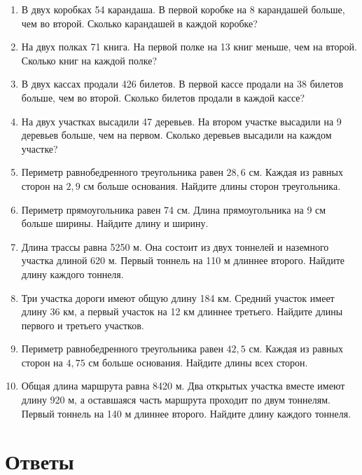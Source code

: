 \documentclass[a4paper,12pt]{article}
\newcommand{\sepLine}{\vspace{0.35em}{\color{accent}\hrule height 0.6pt}\vspace{0.8em}}
\begin{document}
\begin{enumerate}
\item В двух коробках 54 карандаша. В первой коробке на 8 карандашей больше, чем во второй. Сколько карандашей в каждой коробке?

\item На двух полках 71 книга. На первой полке на 13 книг меньше, чем на второй. Сколько книг на каждой полке?

\item В двух кассах продали 426 билетов. В первой кассе продали на 38 билетов больше, чем во второй. Сколько билетов продали в каждой кассе?

\item На двух участках высадили 47 деревьев. На втором участке высадили на 9 деревьев больше, чем на первом. Сколько деревьев высадили на каждом участке?

\item Периметр равнобедренного треугольника равен $28{,}6$ см. Каждая из равных сторон на $2{,}9$ см больше основания. Найдите длины сторон треугольника.

\item Периметр прямоугольника равен 74 см. Длина прямоугольника на 9 см больше ширины. Найдите длину и ширину.

\item Длина трассы равна 5250 м. Она состоит из двух тоннелей и наземного участка длиной 620 м. Первый тоннель на 110 м длиннее второго. Найдите длину каждого тоннеля.

\item Три участка дороги имеют общую длину 184 км. Средний участок имеет длину 36 км, а первый участок на 12 км длиннее третьего. Найдите длины первого и третьего участков.

\item Периметр равнобедренного треугольника равен $42{,}5$ см. Каждая из равных сторон на $4{,}75$ см больше основания. Найдите длины всех сторон.

\item Общая длина маршрута равна 8420 м. Два открытых участка вместе имеют длину 920 м, а оставшаяся часть маршрута проходит по двум тоннелям. Первый тоннель на 140 м длиннее второго. Найдите длину каждого тоннеля.
\end{enumerate}

\clearpage

\section*{Ответы}
\sepLine
\end{document}
